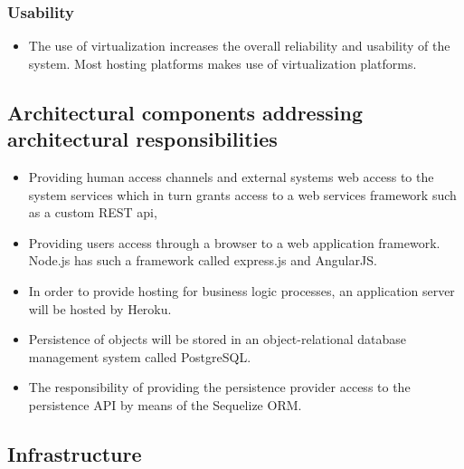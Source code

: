 \documentclass{article}
\begin{document}
		\subsubsection{Usability}\label{subsec:usability}
		\begin{itemize}
			\item The use of virtualization increases the overall reliability and usability of the system. Most hosting platforms makes use of virtualization platforms.
		\end{itemize}

	\subsection{Architectural components addressing architectural responsibilities}
		\begin{itemize}
		\item Providing human access channels and external systems web access to the system services which in turn grants access to a web services framework such as a custom REST api,
		\item Providing users access through a browser to a web application framework. Node.js has such a framework called express.js and AngularJS.
		\item In order to provide hosting for business logic processes, an application server will be hosted by Heroku.
		\item Persistence of objects will be stored in an object-relational database management system called PostgreSQL.
		\item The responsibility of providing the persistence provider access to the persistence API by means of the Sequelize ORM.
		\end{itemize}

\pagebreak
	\subsection{Infrastructure}
\end{document}
